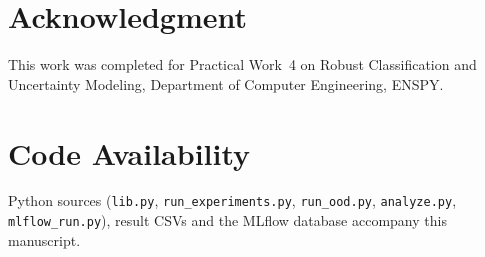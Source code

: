 \documentclass[conference]{IEEEtran}
\begin{document}
\section*{Acknowledgment}
This work was completed for Practical Work~4 on Robust Classification and Uncertainty Modeling, Department of Computer Engineering, ENSPY.

\section*{Code Availability}
Python sources (\texttt{lib.py}, \texttt{run\_experiments.py}, \texttt{run\_ood.py}, \texttt{analyze.py}, \texttt{mlflow\_run.py}), result CSVs and the MLflow database accompany this manuscript.

\IEEEtriggercmd{\newpage}


\end{document}

